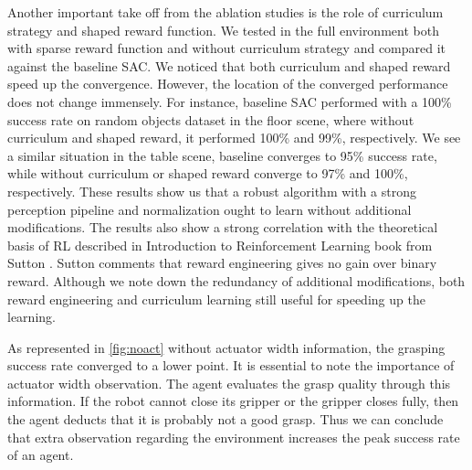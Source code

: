Another important take off from the ablation studies is the role of curriculum strategy and shaped reward function. We tested in the full environment both with sparse reward function and without curriculum strategy and compared it against the baseline SAC. We noticed that both curriculum and shaped reward speed up the convergence. However, the location of the converged performance does not change immensely. For instance, baseline SAC performed with a 100\% success rate on random objects dataset in the floor scene, where without curriculum and shaped reward, it performed 100\% and 99\%, respectively. We see a similar situation in the table scene, baseline converges to 95\% success rate, while without curriculum or shaped reward converge to 97\% and 100\%, respectively. These results show us that a robust algorithm with a strong perception pipeline and normalization ought to learn without additional modifications. The results also show a strong correlation with the theoretical basis of RL described in Introduction to Reinforcement Learning book from Sutton \cite{Sutton2018}. Sutton comments that reward engineering gives no gain over binary reward. Although we note down the redundancy of additional modifications, both reward engineering and curriculum learning still useful for speeding up the learning.

As represented in \ref{fig:noact} without actuator width information, the grasping success rate converged to a lower point. It is essential to note the importance of actuator width observation. The agent evaluates the grasp quality through this information. If the robot cannot close its gripper or the gripper closes fully, then the agent deducts that it is probably not a good grasp. Thus we can conclude that extra observation regarding the environment increases the peak success rate of an agent.





